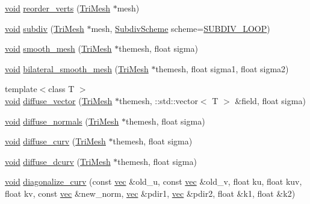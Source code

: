 \begin{DoxyCompactItemize}
\item 
\hyperlink{namespacetrimesh_a784ddfd979e1c579bda795a8edfc3f43}{void} \hyperlink{namespacetrimesh_a69f38c2c1647027b3c1b50e8244dc6e3}{reorder\+\_\+verts} (\hyperlink{classtrimesh_1_1TriMesh}{Tri\+Mesh} $\ast$mesh)
\item 
\hyperlink{namespacetrimesh_a784ddfd979e1c579bda795a8edfc3f43}{void} \hyperlink{namespacetrimesh_a6f861eefce96c48dfcdfda348a2efa43}{subdiv} (\hyperlink{classtrimesh_1_1TriMesh}{Tri\+Mesh} $\ast$mesh, \hyperlink{namespacetrimesh_a3480f7a1d4d92b412ded9f7cfb1450bd}{Subdiv\+Scheme} scheme=\hyperlink{namespacetrimesh_a3480f7a1d4d92b412ded9f7cfb1450bdafebba588d345b33d58dd0fe8e2868a57}{S\+U\+B\+D\+I\+V\+\_\+\+L\+O\+OP})
\item 
\hyperlink{namespacetrimesh_a784ddfd979e1c579bda795a8edfc3f43}{void} \hyperlink{namespacetrimesh_a8b38bcecd65c147dfe9011c2a4d6fdda}{smooth\+\_\+mesh} (\hyperlink{classtrimesh_1_1TriMesh}{Tri\+Mesh} $\ast$themesh, float sigma)
\item 
\hyperlink{namespacetrimesh_a784ddfd979e1c579bda795a8edfc3f43}{void} \hyperlink{namespacetrimesh_a7ceff7daca94fc7bdb7f39fdd7f4324b}{bilateral\+\_\+smooth\+\_\+mesh} (\hyperlink{classtrimesh_1_1TriMesh}{Tri\+Mesh} $\ast$themesh, float sigma1, float sigma2)
\item 
{\footnotesize template$<$class T $>$ }\\\hyperlink{namespacetrimesh_a784ddfd979e1c579bda795a8edfc3f43}{void} \hyperlink{namespacetrimesh_a8fa6ac94a71d33cb6e11c29e76501519}{diffuse\+\_\+vector} (\hyperlink{classtrimesh_1_1TriMesh}{Tri\+Mesh} $\ast$themesh, \+::std\+::vector$<$ T $>$ \&field, float sigma)
\item 
\hyperlink{namespacetrimesh_a784ddfd979e1c579bda795a8edfc3f43}{void} \hyperlink{namespacetrimesh_ad8505186d2e0e0ffff60dbb77ad9be8d}{diffuse\+\_\+normals} (\hyperlink{classtrimesh_1_1TriMesh}{Tri\+Mesh} $\ast$themesh, float sigma)
\item 
\hyperlink{namespacetrimesh_a784ddfd979e1c579bda795a8edfc3f43}{void} \hyperlink{namespacetrimesh_a3985e4c8a4cb1fcaebc0a6edffcd58bb}{diffuse\+\_\+curv} (\hyperlink{classtrimesh_1_1TriMesh}{Tri\+Mesh} $\ast$themesh, float sigma)
\item 
\hyperlink{namespacetrimesh_a784ddfd979e1c579bda795a8edfc3f43}{void} \hyperlink{namespacetrimesh_ab0d66915ca4f2f71c7726947463fe36d}{diffuse\+\_\+dcurv} (\hyperlink{classtrimesh_1_1TriMesh}{Tri\+Mesh} $\ast$themesh, float sigma)
\item 
\hyperlink{namespacetrimesh_a784ddfd979e1c579bda795a8edfc3f43}{void} \hyperlink{namespacetrimesh_a598226133f56948e8f2b139a1eba4291}{diagonalize\+\_\+curv} (const \hyperlink{namespacetrimesh_a4fc2b83feba99c931f837a0c7d4b4df1}{vec} \&old\+\_\+u, const \hyperlink{namespacetrimesh_a4fc2b83feba99c931f837a0c7d4b4df1}{vec} \&old\+\_\+v, float ku, float kuv, float kv, const \hyperlink{namespacetrimesh_a4fc2b83feba99c931f837a0c7d4b4df1}{vec} \&new\+\_\+norm, \hyperlink{namespacetrimesh_a4fc2b83feba99c931f837a0c7d4b4df1}{vec} \&pdir1, \hyperlink{namespacetrimesh_a4fc2b83feba99c931f837a0c7d4b4df1}{vec} \&pdir2, float \&k1, float \&k2)

\end{DoxyCompactItemize}
